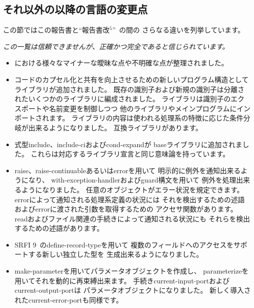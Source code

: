 \subsection*{それ以外の\rfivers 以降の言語の変更点}
\label{differences}
この節ではこの報告書と``報告書改$^5$''~\cite{R5RS}の間の
さらなる違いを列挙しています。

{\em この一覧は信頼できませんが、正確かつ完全であると信じられています。}

\begin{itemize}

\item \rfivers における様々なマイナーな曖昧な点や不明確な点が整理されました。

\item コードのカプセル化と共有を向上させるための新しいプログラム構造として
ライブラリが追加されました。
既存の識別子および新規の識別子は分離されたいくつかのライブラリに編成されました。
ライブラリは識別子のエクスポートや名前変更を制御しつつ
他のライブラリやメインプログラムにインポートされます。
ライブラリの内容は使われる処理系の特徴に応じた条件分岐が出来るようになりました。
\rfivers 互換ライブラリがあります。

\item 式型{\cf include}、{\cf include-ci}および{\cf cond-expand}が
baseライブラリに追加されました。
これらは対応するライブラリ宣言と同じ意味論を持っています。

\item {\cf raise}、{\cf raise-continuable}あるいは{\cf error}を用いて
明示的に例外を通知出来るようになり、
{\cf with-exception-handler}および{\cf guard}構文を用いて
例外を処理出来るようになりました。
任意のオブジェクトがエラー状況を規定できます。
{\cf error}によって通知される処理系定義の状況には
それを検出するための述語および{\cf error}に渡された引数を取得するための
アクセサ関数があります。
{\cf read}およびファイル関連の手続きによって通知される状況にも
それらを検出するための述語があります。

\item SRFI 9~\cite{srfi9}の{\cf define-record-type}を用いて
複数のフィールドへのアクセスをサポートする新しい独立した型を
生成出来るようになりました。

\item {\cf make-parameter}を用いてパラメータオブジェクトを作成し、
{\cf parameterize}を用いてそれを動的に再束縛出来ます。
手続き{\cf current-input-port}および{\cf current-output-port}は
パラメータオブジェクトになりました。
新しく導入された{\cf current-error-port}も同様です。


\end{itemize}
